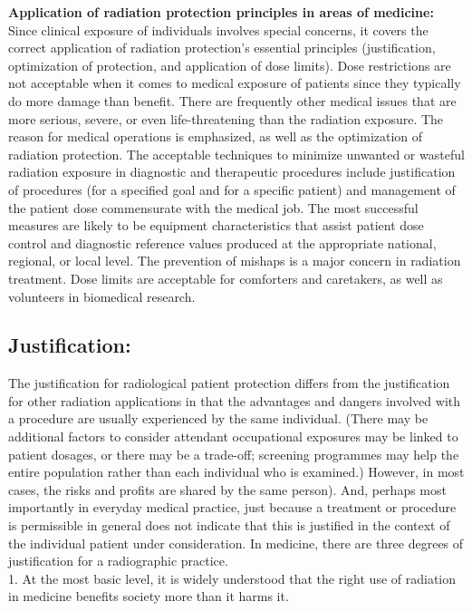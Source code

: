 \documentclass{article}
\begin{document}
\textbf{Application of radiation protection principles in areas of medicine:} Since clinical exposure of individuals involves special concerns, it covers the correct application of radiation protection's essential principles (justification, optimization of protection, and application of dose limits). Dose restrictions are not acceptable when it comes to medical exposure of patients since they typically do more damage than benefit. There are frequently other medical issues that are more serious, severe, or even life-threatening than the radiation exposure. The reason for medical operations is emphasized, as well as the optimization of radiation protection. The acceptable techniques to minimize unwanted or wasteful radiation exposure in diagnostic and therapeutic procedures include justification of procedures (for a specified goal and for a specific patient) and management of the patient dose commensurate with the medical job. The most successful measures are likely to be equipment characteristics that assist patient dose control and diagnostic reference values produced at the appropriate national, regional, or local level. The prevention of mishaps is a major concern in radiation treatment. Dose limits are acceptable for comforters and caretakers, as well as volunteers in biomedical research.

\subsection{Justification:  }

The justification for radiological patient protection differs from the justification for other radiation applications in that the advantages and dangers involved with a procedure are usually experienced by the same individual. (There may be additional factors to consider attendant occupational exposures may be linked to patient dosages, or there may be a trade-off; screening programmes may help the entire population rather than each individual who is examined.) However, in most cases, the risks and profits are shared by the same person). And, perhaps most importantly in everyday medical practice, just because a treatment or procedure is permissible in general does not indicate that this is justified in the context of the individual patient under consideration. In medicine, there are three degrees of justification for a radiographic practice. \\

1.	At the most basic level, it is widely understood that the right use of radiation in medicine benefits society more than it harms it.
\end{document}
